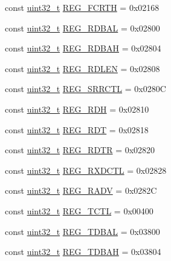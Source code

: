 \begin{DoxyCompactItemize}
\item 
const \hyperlink{Type_8hh_a435d1572bf3f880d55459d9805097f62}{uint32\_\-t} \hyperlink{namespaceiGbReg_a9035848a36c2d1c1dabebf2c06e48ec4}{REG\_\-FCRTH} = 0x02168
\item 
const \hyperlink{Type_8hh_a435d1572bf3f880d55459d9805097f62}{uint32\_\-t} \hyperlink{namespaceiGbReg_a4e047b0e945c6d8b534316c82c521bd1}{REG\_\-RDBAL} = 0x02800
\item 
const \hyperlink{Type_8hh_a435d1572bf3f880d55459d9805097f62}{uint32\_\-t} \hyperlink{namespaceiGbReg_ac8a837e0dbaf3e028db7609cf2318f10}{REG\_\-RDBAH} = 0x02804
\item 
const \hyperlink{Type_8hh_a435d1572bf3f880d55459d9805097f62}{uint32\_\-t} \hyperlink{namespaceiGbReg_adef77c18ff90a18f8c6fe73f0e61f7fa}{REG\_\-RDLEN} = 0x02808
\item 
const \hyperlink{Type_8hh_a435d1572bf3f880d55459d9805097f62}{uint32\_\-t} \hyperlink{namespaceiGbReg_ab0639bae5d2694cf8a8f9aaaba9d4977}{REG\_\-SRRCTL} = 0x0280C
\item 
const \hyperlink{Type_8hh_a435d1572bf3f880d55459d9805097f62}{uint32\_\-t} \hyperlink{namespaceiGbReg_a281c8814cfaf1f24aba3ec4e47843b6e}{REG\_\-RDH} = 0x02810
\item 
const \hyperlink{Type_8hh_a435d1572bf3f880d55459d9805097f62}{uint32\_\-t} \hyperlink{namespaceiGbReg_ad7ea3f0ced376d107086bfab67befbc8}{REG\_\-RDT} = 0x02818
\item 
const \hyperlink{Type_8hh_a435d1572bf3f880d55459d9805097f62}{uint32\_\-t} \hyperlink{namespaceiGbReg_a345db3e807c4b47229f85d58ba1836d8}{REG\_\-RDTR} = 0x02820
\item 
const \hyperlink{Type_8hh_a435d1572bf3f880d55459d9805097f62}{uint32\_\-t} \hyperlink{namespaceiGbReg_a03190c72ce8dd147689b7e671fbb3e70}{REG\_\-RXDCTL} = 0x02828
\item 
const \hyperlink{Type_8hh_a435d1572bf3f880d55459d9805097f62}{uint32\_\-t} \hyperlink{namespaceiGbReg_ae1605063bdee3a13f9e9eda5280a7d74}{REG\_\-RADV} = 0x0282C
\item 
const \hyperlink{Type_8hh_a435d1572bf3f880d55459d9805097f62}{uint32\_\-t} \hyperlink{namespaceiGbReg_a821ebe9f73862e5f08d712f01cfd626d}{REG\_\-TCTL} = 0x00400
\item 
const \hyperlink{Type_8hh_a435d1572bf3f880d55459d9805097f62}{uint32\_\-t} \hyperlink{namespaceiGbReg_ae124cd934d893dedf0c92172b4899701}{REG\_\-TDBAL} = 0x03800
\item 
const \hyperlink{Type_8hh_a435d1572bf3f880d55459d9805097f62}{uint32\_\-t} \hyperlink{namespaceiGbReg_a7042bc647b8afdb47eee2760c44fa592}{REG\_\-TDBAH} = 0x03804

\end{DoxyCompactItemize}
